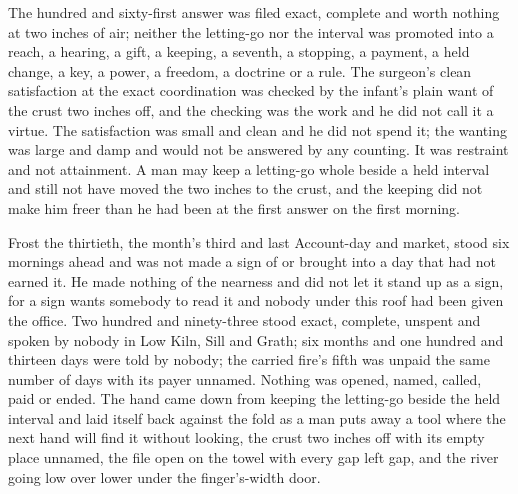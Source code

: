 The hundred and sixty-first answer was filed exact, complete and worth nothing at two inches of air; neither the letting-go nor the interval was promoted into a reach, a hearing, a gift, a keeping, a seventh, a stopping, a payment, a held change, a key, a power, a freedom, a doctrine or a rule. The surgeon's clean satisfaction at the exact coordination was checked by the infant's plain want of the crust two inches off, and the checking was the work and he did not call it a virtue. The satisfaction was small and clean and he did not spend it; the wanting was large and damp and would not be answered by any counting. It was restraint and not attainment. A man may keep a letting-go whole beside a held interval and still not have moved the two inches to the crust, and the keeping did not make him freer than he had been at the first answer on the first morning.

Frost the thirtieth, the month's third and last Account-day and market, stood six mornings ahead and was not made a sign of or brought into a day that had not earned it. He made nothing of the nearness and did not let it stand up as a sign, for a sign wants somebody to read it and nobody under this roof had been given the office. Two hundred and ninety-three stood exact, complete, unspent and spoken by nobody in Low Kiln, Sill and Grath; six months and one hundred and thirteen days were told by nobody; the carried fire's fifth was unpaid the same number of days with its payer unnamed. Nothing was opened, named, called, paid or ended. The hand came down from keeping the letting-go beside the held interval and laid itself back against the fold as a man puts away a tool where the next hand will find it without looking, the crust two inches off with its empty place unnamed, the file open on the towel with every gap left gap, and the river going low over lower under the finger's-width door.
